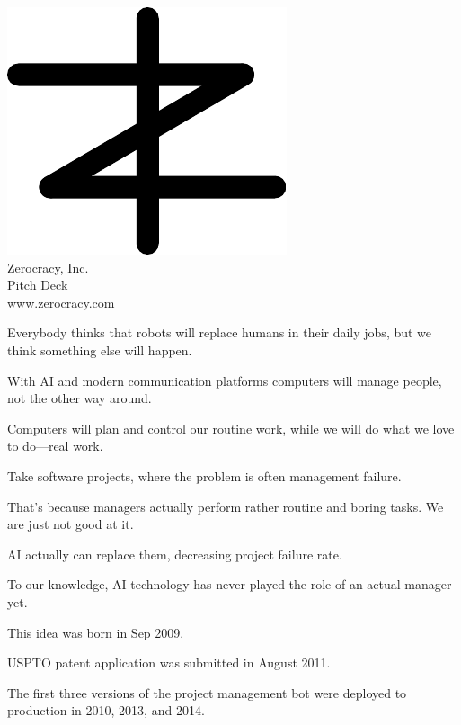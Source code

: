 \documentclass{article}
\begin{document}

\pagecolor{white}
\newcommand\slide[1]{%
  \pagebreak\topskip0pt\vspace*{\fill}%
  \begin{center}\Huge%
  #1
  \end{center}%
  \vspace*{\fill}%
}

\slide{\includegraphics[scale=1]{../images/zerocracy-logo.pdf}\\
Zerocracy, Inc.\\[1em]
\large
Pitch Deck\\
\href{https://www.zerocracy.com}{www.zerocracy.com}}

\slide{Everybody thinks that robots will replace humans in their daily jobs, but we think something else will happen.}

\slide{With AI and modern communication platforms computers will manage people, not the other way around.}

\slide{Computers will plan and control our routine work, while we will do what we love to do---real work.}

\slide{Take software projects, where the problem is often management failure.}

\slide{That's because managers actually perform rather routine and boring tasks. We are just not good at it.}

\slide{AI actually can replace them, decreasing project failure rate.}

\slide{To our knowledge, AI technology has never played the role of an actual manager yet.}

\slide{This idea was born in Sep 2009.}

\slide{USPTO patent application was submitted in August 2011.\quad{\large US 12/703,202}}

\slide{The first three versions of the project management bot were deployed to production in 2010, 2013, and 2014.}
\end{document}
